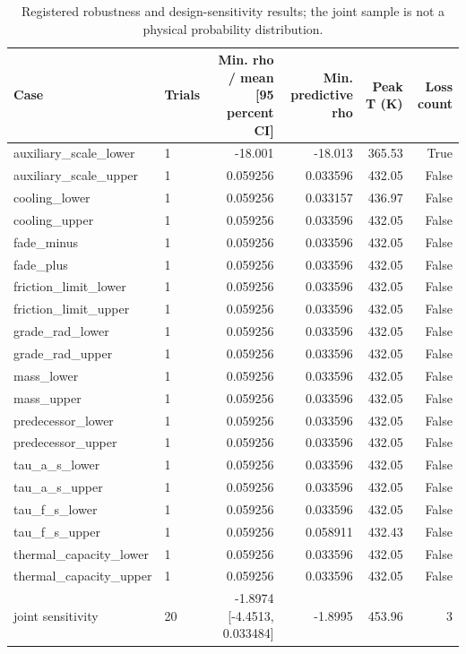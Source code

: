 \begin{table}[!t]
\centering
\scriptsize
\caption{Registered robustness and design-sensitivity results; the joint sample is not a physical probability distribution.}
\label{tab:phase2m-robustness}
\begin{tabular}{llrrrr}
\hline
Case & Trials & Min. rho / mean [95 percent CI] & Min. predictive rho & Peak T (K) & Loss count \\
\hline
auxiliary\_scale\_lower & 1 & -18.001 & -18.013 & 365.53 & True \\
auxiliary\_scale\_upper & 1 & 0.059256 & 0.033596 & 432.05 & False \\
cooling\_lower & 1 & 0.059256 & 0.033157 & 436.97 & False \\
cooling\_upper & 1 & 0.059256 & 0.033596 & 432.05 & False \\
fade\_minus & 1 & 0.059256 & 0.033596 & 432.05 & False \\
fade\_plus & 1 & 0.059256 & 0.033596 & 432.05 & False \\
friction\_limit\_lower & 1 & 0.059256 & 0.033596 & 432.05 & False \\
friction\_limit\_upper & 1 & 0.059256 & 0.033596 & 432.05 & False \\
grade\_rad\_lower & 1 & 0.059256 & 0.033596 & 432.05 & False \\
grade\_rad\_upper & 1 & 0.059256 & 0.033596 & 432.05 & False \\
mass\_lower & 1 & 0.059256 & 0.033596 & 432.05 & False \\
mass\_upper & 1 & 0.059256 & 0.033596 & 432.05 & False \\
predecessor\_lower & 1 & 0.059256 & 0.033596 & 432.05 & False \\
predecessor\_upper & 1 & 0.059256 & 0.033596 & 432.05 & False \\
tau\_a\_s\_lower & 1 & 0.059256 & 0.033596 & 432.05 & False \\
tau\_a\_s\_upper & 1 & 0.059256 & 0.033596 & 432.05 & False \\
tau\_f\_s\_lower & 1 & 0.059256 & 0.033596 & 432.05 & False \\
tau\_f\_s\_upper & 1 & 0.059256 & 0.058911 & 432.43 & False \\
thermal\_capacity\_lower & 1 & 0.059256 & 0.033596 & 432.05 & False \\
thermal\_capacity\_upper & 1 & 0.059256 & 0.033596 & 432.05 & False \\
joint sensitivity & 20 & -1.8974 [-4.4513, 0.033484] & -1.8995 & 453.96 & 3 \\
\hline
\end{tabular}
\end{table}
